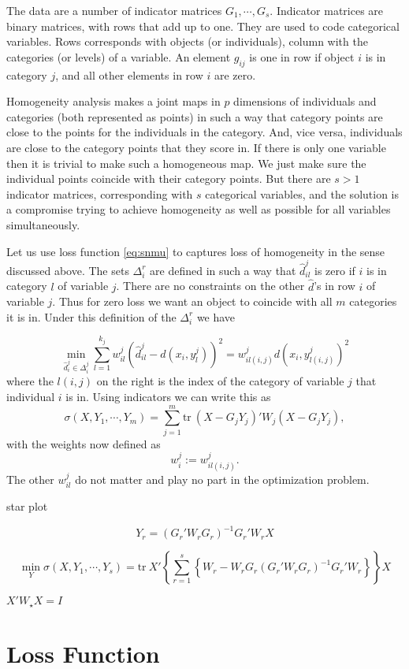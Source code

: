 \documentclass[
  12pt,
]{article}
\begin{document}
The data are a number of indicator matrices \(G_1,\cdots,G_s\). Indicator matrices are binary matrices, with rows that add up to one. They are
used to code categorical variables. Rows corresponds with objects
(or individuals), column with the categories (or levels) of a variable.
An element \(g_{ij}\) is one in row if object \(i\) is in category \(j\),
and all other elements in row \(i\) are zero.

Homogeneity analysis makes a joint maps in \(p\) dimensions of individuals
and categories (both represented as points) in such a way that category points are close to the points for the individuals in the category. And, vice versa, individuals are close to the category points that they score in.
If there is only one variable then it is trivial to make such a
homogeneous map. We just make sure the individual points coincide with
their category points. But there are \(s>1\) indicator matrices, corresponding with \(s\) categorical variables, and the solution is a compromise trying to achieve homogeneity as well as possible for all variables simultaneously.

Let us use loss function \eqref{eq:snmu} to captures loss of homogeneity in
the sense discussed above.
The sets \(\Delta_i^r\) are defined in such a way that \(\hat d_{il}^j\) is zero if \(i\) is in category \(l\) of
variable \(j\). There are no constraints on the other \(\hat d\)'s in row \(i\)
of variable \(j\). Thus for zero loss we want an object to coincide with all \(m\) categories it is in. Under this definition of the \(\Delta_i^r\) we have

\[
\min_{\hat d_i^j\in\Delta_i^j}\sum_{l=1}^{k_j}w_{il}^j(\hat d_{il}^j-d(x_i,y_l^j))^2=w_{il(i,j)}^jd(x_i,y_{l(i,j)}^j)^2
\]
where the \(l(i,j)\) on the right is the index of the category of variable \(j\) that individual \(i\) is in. Using indicators we can write this as
\[
\sigma(X,Y_1,\cdots,Y_m)=
\sum_{j=1}^m\text{tr}\ (X-G_jY_j)'W_j(X-G_jY_j),
\]
with the weights now defined as
\[
w_i^j:=w_{il(i,j)}^j.
\]
The other \(w_{il}^j\) do not matter and play no part in the optimization
problem.

star plot

\[Y_r=(G_r'W_rG_r)^{-1}G_r'W_rX\]

\[
\min_Y\sigma(X,Y_1,\cdots,Y_s)=\text{tr}\ X'\left\{\sum_{r=1}^s\left\{W_r-W_rG_r(G_r'W_rG_r)^{-1}G_r'W_r\right\}\right\}X
\]

\(X'W_\star X=I\)

\section{Loss Function}\label{loss-function}
\end{document}
